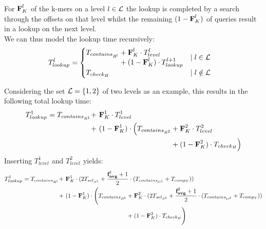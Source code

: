 \documentclass[a4paper,titlepage,onecolumn,oneside,12pt,nenglish,titlepage=firstiscover]{scrbook}
\theoremstyle{plain} %
\theoremstyle{definition} %
\theoremstyle{remark} %
\theoremstyle{plain}
\newcommand{\level}{l}
\newcommand{\contains}{contains}
\newcommand{\select}{sel}
\newcommand{\compare}{comp}
\newcommand{\timeForOperationOnStructure}[2]{T_{#1_{#2}}} %
\newcommand{\varAverageFrequency}{\textbf{f}_{\textbf{avg}}}
\begin{document}
For $\varCDF{K}^\level$ of the k-mers on a level $l \in \mathcal{L}$ the lookup is completed by a search through the offsets on that level whilst the remaining $(1-\varCDF{K}^\level)$ of queries result in a lookup on the next level.\\
We can thus model the lookup time recursively:
\begin{align*}
	\timeForOperationOnStructure{lookup}{}^{l} &= 
	\begin{cases}
	\begin{aligned}
		\timeForOperationOnStructure{\contains}{R^\level} &+ \varCDF{K}^\level \cdot \timeForOperationOnStructure{level}{}^\level\\
		&+ (1-\varCDF{K}^\level) \cdot \timeForOperationOnStructure{lookup}{}^{l+1}
	\end{aligned} &\mid l \in \setOfLevels\\
	\timeForOperationOnStructure{check}{H} &\mid l \notin \setOfLevels
\end{cases}
\end{align*}

Considering the set $\mathcal{L} = \{ 1,2 \}$ of two levels as an example, this results in the following total lookup time:
\begin{align*}
	\timeForOperationOnStructure{lookup}{}^1 = \timeForOperationOnStructure{\contains}{R^1} +&~ \varCDF{K}^1 \cdot \timeForOperationOnStructure{level}{}^1\\
		+&~ (1-\varCDF{K}^1) \cdot \Big( \timeForOperationOnStructure{\contains}{R^2} + \varCDF{K}^2 \cdot \timeForOperationOnStructure{level}{}^2\\
		&~ \phantom{(1-\varCDF{K}^1) \cdot \Big( \timeForOperationOnStructure{\contains}{R^2}} + (1-\varCDF{K}^2) \cdot \timeForOperationOnStructure{check}{H} \Big)\\
\end{align*}
Inserting $\timeForOperationOnStructure{level}{}^1$ and $\timeForOperationOnStructure{level}{}^2$ yields:
\begin{align*}
	\timeForOperationOnStructure{lookup}{}^1 =
		\timeForOperationOnStructure{\contains}{R^1} +&~ \varCDF{K}^1 \cdot (2\timeForOperationOnStructure{\select}{S^1} + \frac{\varAverageFrequency^1+1}{2}  \cdot (\timeForOperationOnStructure{\contains}{O^1} + \timeForOperationOnStructure{\compare}{T}))\\
			+&~ (1-\varCDF{K}^1) \cdot \Bigg(\timeForOperationOnStructure{\contains}{R^2} + \varCDF{K}^2 \cdot (2\timeForOperationOnStructure{\select}{S^2} + \frac{\varAverageFrequency^2+1}{2}  \cdot (\timeForOperationOnStructure{\contains}{O^2} + \timeForOperationOnStructure{\compare}{T}))\\
			&~\phantom{(1-\varCDF{K}^1) \cdot \Bigg(\timeForOperationOnStructure{\contains}{R^2}} + (1-\varCDF{K}^2) \cdot \timeForOperationOnStructure{check}{H} \Bigg)
\end{align*}
\end{document}
